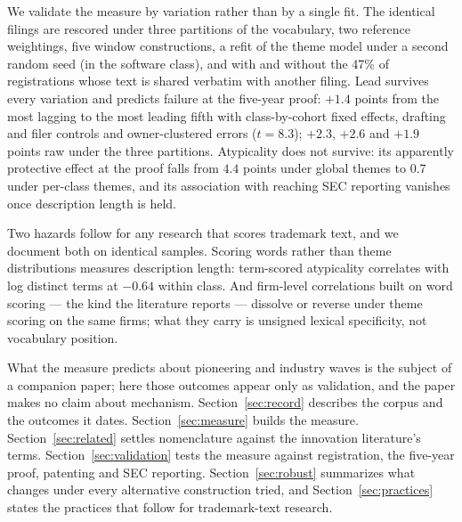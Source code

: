 We validate the measure by variation rather than by a single fit. The
identical filings are rescored under three partitions of the vocabulary,
two reference weightings, five window constructions, a refit of the
theme model under a second random seed (in the software class),
and with and without the 47\% of registrations whose text is shared
verbatim with another filing. Lead survives every variation and predicts
failure at the five-year proof: $+1.4$ points from the most lagging to
the most leading fifth with class-by-cohort fixed effects, drafting and
filer controls and owner-clustered errors ($t = 8.3$); $+2.3$, $+2.6$
and $+1.9$ points raw under the three partitions. Atypicality does not
survive: its apparently protective effect at the proof falls from $4.4$
points under global themes to $0.7$ under per-class themes, and its
association with reaching SEC reporting vanishes once description
length is held.

Two hazards follow for any research that scores trademark text, and we
document both on identical samples. Scoring words rather than theme
distributions measures description length: term-scored atypicality
correlates with log distinct terms at $-0.64$ within class. And firm-level
correlations built on word scoring --- the kind the literature reports
--- dissolve or reverse under theme scoring on the same firms; what they
carry is unsigned lexical specificity, not vocabulary position.

What the measure predicts about pioneering and industry waves is the
subject of a companion paper; here those outcomes appear only as
validation, and the paper makes no claim about mechanism.
Section~\ref{sec:record} describes the corpus and the outcomes it dates.
Section~\ref{sec:measure} builds the measure. Section~\ref{sec:related}
settles nomenclature against the innovation literature's terms.
Section~\ref{sec:validation} tests the measure against registration, the
five-year proof, patenting and SEC reporting.
Section~\ref{sec:robust} summarizes what changes under every alternative
construction tried, and Section~\ref{sec:practices} states the practices
that follow for trademark-text research.
